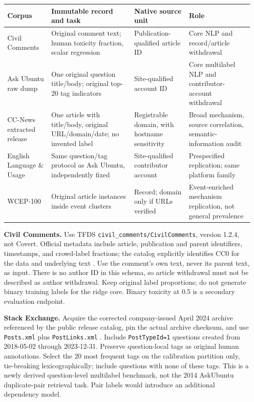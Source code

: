 \documentclass[11pt,a4paper]{article}
\newcommand{\smalltable}{\small\renewcommand{\arraystretch}{1.14}}
\begin{document}
{\smalltable
\begin{longtable}{p{.18\linewidth}p{.28\linewidth}p{.22\linewidth}p{.23\linewidth}}
\toprule Corpus & Immutable record and task & Native source unit & Role\\\midrule\endhead
Civil Comments & Original comment text; human toxicity fraction, scalar regression & Publication-qualified article ID & Core NLP and record/article withdrawal\\
Ask Ubuntu raw dump & One original question title/body; original top-20 tag indicators & Site-qualified account ID & Core multilabel NLP and contributor-account withdrawal\\
CC-News extracted release & One article with title/body, original URL/domain/date; no invented label & Registrable domain, with hostname sensitivity & Broad mechanism, source correlation, semantic-information audit\\
English Language \& Usage & Same question/tag protocol as Ask Ubuntu, independently fixed & Site-qualified contributor account & Prespecified replication; same platform family\\
WCEP-100 & Original article instances inside event clusters & Record; domain only if URLs verified & Event-enriched mechanism replication, not general prevalence\\
\bottomrule
\end{longtable}}

\textbf{Civil Comments.} Use TFDS \texttt{civil\_comments/CivilComments}, version 1.2.4, not Covert. Official metadata include article, publication and parent identifiers, timestamps, and crowd-label fractions; the catalog explicitly identifies CC0 for the data and underlying text \cite{civil}. Use the comment's own text, never its parent text, as input. There is no author ID in this schema, so article withdrawal must not be described as author withdrawal. Keep original label proportions; do not generate binary training labels for the ridge core. Binary toxicity at 0.5 is a secondary evaluation endpoint.

\textbf{Stack Exchange.} Acquire the corrected company-issued April 2024 archive referenced by the public release catalog, pin the actual archive checksum, and use \texttt{Posts.xml} plus \texttt{PostLinks.xml} \cite{sedumps,schema}. Include \texttt{PostTypeId=1} questions created from 2018-05-02 through 2023-12-31. Preserve question-local tags as original human annotations. Select the 20 most frequent tags on the calibration partition only, tie-breaking lexicographically; include questions with none of these tags. This is a newly derived question-level multilabel benchmark, not the 2014 AskUbuntu duplicate-pair retrieval task. Pair labels would introduce an additional dependency model.
\end{document}
